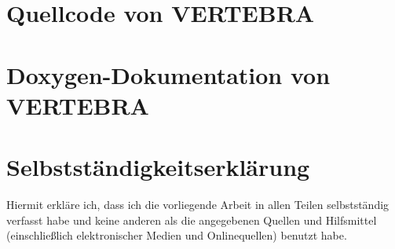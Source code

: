 \documentclass[a4paper]{scrartcl}
\begin{document}
\section{Quellcode von VERTEBRA}
\section{Doxygen-Dokumentation von VERTEBRA}
\section{Selbstständigkeitserklärung}
Hiermit erkläre ich, dass ich die vorliegende Arbeit in allen Teilen selbstständig verfasst habe und keine anderen als die angegebenen Quellen und Hilfsmittel (einschließlich elektronischer Medien und Onlinequellen) benutzt habe.
\newpage


\end{document}
